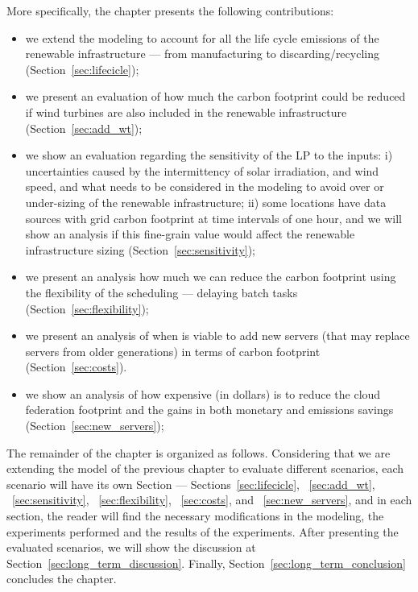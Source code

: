 More specifically, the chapter presents the following contributions:

\begin{itemize}
 
\item we extend the modeling to account for all the life cycle emissions of the renewable infrastructure --- from manufacturing to discarding/recycling (Section~\ref{sec:lifecicle});
\item we present an evaluation of how much the carbon footprint could be reduced if wind turbines are also included in the renewable infrastructure   (Section~\ref{sec:add_wt});
\item we show an evaluation regarding the sensitivity of the LP to the inputs: i) uncertainties caused by the intermittency of solar irradiation, and wind speed, and what needs to be considered in the modeling to avoid over or under-sizing of the renewable infrastructure; ii) some locations have data sources with grid carbon footprint at time intervals of one hour, and we will show an analysis if this fine-grain value would affect the renewable infrastructure sizing  (Section~\ref{sec:sensitivity});
\item we present an analysis how much we can reduce the carbon footprint using the flexibility of the scheduling --- delaying batch tasks (Section~\ref{sec:flexibility});
\item we present an analysis of when is viable to add new servers (that may replace servers from older generations) in terms of carbon footprint  (Section~\ref{sec:costs}).
\item we show an analysis of how expensive (in dollars) is to reduce the cloud federation footprint and the gains in both monetary and emissions savings (Section~\ref{sec:new_servers});
  
\end{itemize}


The remainder of the chapter is organized as follows. Considering that we are extending the model of the previous chapter to evaluate different scenarios, each scenario will have its own Section --- Sections~\ref{sec:lifecicle}, ~\ref{sec:add_wt}, ~\ref{sec:sensitivity}, ~\ref{sec:flexibility}, ~\ref{sec:costs}, and  ~\ref{sec:new_servers}, and in each section, the reader will find the necessary modifications in the modeling, the experiments performed and the results of the experiments. After presenting the evaluated scenarios, we will show the discussion at Section~\ref{sec:long_term_discussion}. Finally, Section~\ref{sec:long_term_conclusion} concludes the chapter.


